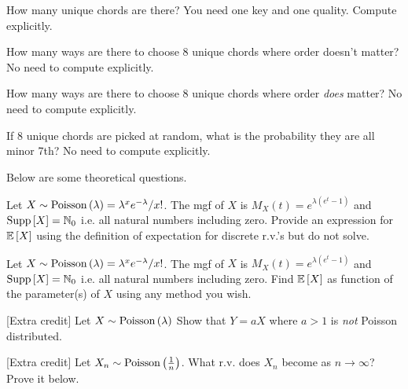 \documentclass[12pt]{article}
\begin{document}
\benum
{} How many unique chords are there? You need one key and one quality. Compute explicitly. 

 How many ways are there to choose 8 unique chords where order doesn't matter? No need to compute explicitly. 

 How many ways are there to choose 8 unique chords where order \emph{does} matter? No need to compute explicitly. 


 If 8 unique chords are picked at random, what is the probability they are all minor 7th? No need to compute explicitly. 


\eenum



\problem Below are some theoretical questions.

\benum
{} Let $X \sim \mathrm{Poisson}\left(\lambda\right) = \lambda^x e^{-\lambda} / x!$. The mgf of $X$ is $M_X(t) = e^{\lambda (e^t - 1)}$ and $\text{Supp}\left[X\right] = \mathbb{N}_0$ i.e. all natural numbers including zero. Provide an expression for $\mathbb{E}\left[X\right]$ using the definition of expectation for discrete r.v.'s but do not solve. 


 Let $X \sim \mathrm{Poisson}\left(\lambda\right) = \lambda^x e^{-\lambda} / x!$. The mgf of $X$ is $M_X(t) = e^{\lambda (e^t - 1)}$ and $\text{Supp}\left[X\right] = \mathbb{N}_0$ i.e. all natural numbers including zero. Find $\mathbb{E}\left[X\right]$ as function of the parameter(s) of $X$ using any method you wish. 

 [Extra credit] Let $X \sim \mathrm{Poisson}\left(\lambda\right)$ Show that $Y = aX$ where $a>1$ is \emph{not} Poisson distributed. 

 [Extra credit] Let $X_n \sim \mathrm{Poisson}\left(\frac{1}{n}\right)$. What r.v. does $X_n$ become as $n \rightarrow \infty$? Prove it below. 
\eenum
\end{document}
